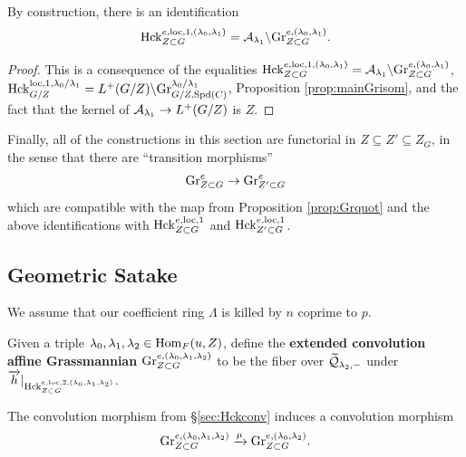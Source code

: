 By construction, there is an identification
\begin{equation*}
 \mathrm{Hck}_{Z \subset G}^{e,\mathrm{loc},1,(\lambda_{0},\lambda_{1})} =   \mathcal{A}_{\lambda_{1}} \backslash \textnormal{Gr}_{Z \subset G}^{e,(\lambda_{0},\lambda_{1})}.
\end{equation*}

\begin{proof}
This is a consequence of the equalities $\mathrm{Hck}_{Z \subset G}^{e,\mathrm{loc},1,(\lambda_{0},\lambda_{1})} =  \mathcal{A}_{\lambda_{1}} \backslash \textnormal{Gr}_{Z \subset G}^{e,(\lambda_{0},\lambda_{1})}$, $\mathrm{Hck}_{G/Z}^{\mathrm{loc},1,\lambda_{0}/\lambda_{1}} = L^{+}(G/Z) \backslash \textnormal{Gr}_{G/Z,\mathrm{Spd}(C)}^{\lambda_{0}/\lambda_{1}}$, Proposition \ref{prop:mainGrisom}, and the fact that the kernel of $\mathcal{A}_{\lambda_{1}} \to L^{+}(G/Z)$ is $Z$.
\end{proof}

Finally, all of the constructions in this section are functorial in $Z \subseteq Z' \subseteq Z_{G}$, in the sense that there are ``transition morphisms''
\begin{equation*}
\textnormal{Gr}_{Z \subset G}^{e} \to \textnormal{Gr}_{Z' \subset G}^{e}
\end{equation*}
which are compatible with the map from Proposition \ref{prop:Grquot} and the above identifications with $\mathrm{Hck}_{Z \subset G}^{e,\mathrm{loc},1}$ and  $\mathrm{Hck}_{Z' \subset G}^{e,\mathrm{loc},1}$.

\subsection{Geometric Satake}
 We assume that our coefficient ring $\Lambda$  is killed by $n$ coprime to $p$.
 
 \begin{defi}\label{defi:convGre} Given a triple $\lambda_{0},\lambda_{1}, \lambda_{2} \in \mathrm{Hom}_{F}(u,Z)$, define the \textbf{extended convolution affine Grassmannian} $\textnormal{Gr}_{Z \subset G}^{e,(\lambda_{0},\lambda_{1},\lambda_{2})}$ to be the fiber over $\widetilde{\mathcal{Q}}_{\lambda_{2},-}$ under $\overrightarrow{h}|_{\mathrm{Hck}_{Z \subset G}^{e,\mathrm{loc},2,(\lambda_{0},\lambda_{1},\lambda_{2})}}$.
 \end{defi}

The convolution morphism from \S \ref{sec:Hckconv} induces a convolution morphism
\begin{equation*}
    \textnormal{Gr}_{Z \subset G}^{e,(\lambda_{0},\lambda_{1},\lambda_{2})} \xrightarrow{\mu} \textnormal{Gr}_{Z \subset G}^{e,(\lambda_{0},\lambda_{2})}.
\end{equation*}

